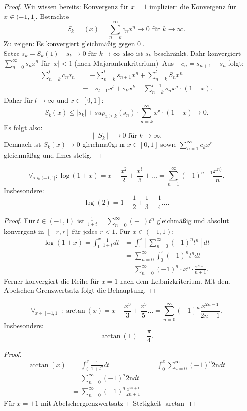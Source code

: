 \begin{proof}
    Wir wissen bereits: Konvergenz für $x=1$ impliziert die Konvergenz für $x \in (-1,1]$. Betrachte
    \[
        S_k=(x)= \sum_{n=k}^{\infty} c_nx^{n} \to 0 \text{ für  } k \to \infty
    .\]
    Zu zeigen: Es konvergiert gleichmäßig gegen $0$ . \\
    Setze $s_k= S_k(1) \quad s_k \to 0$ für $k \to \infty$ also ist $s_k$ beschränkt. Dahr konvergiert $\sum_{n=0}^{\infty} s_nx^{n}$ für $|x| <1$ (nach Majorantenkriterium). Aus $-c_n = s_{n+1}-s_n$ folgt:
\begin{align*}
    \sum_{n=k}^{l} c_nx_n &= -\sum_{n=k}^{l} s_{n+1}x^{n}+ \sum_{n=k}^{l} S_n x^{n} \\
                          &= -s_{l+1} x^{l}+ s_k x^k - \sum_{n=k}^{l-1} s_n x^{n}\cdot (1-x)
.\end{align*}
Daher für $l \to \infty$ und $x \in [0,1]$: 
\[
S_k(x) \le  |s_k| + sup_{n\ge k}(s_n) \cdot \sum_{n=k}^{\infty} x^{n}\cdot (1-x) \to 0
.\] 
Es folgt also:
\[
    \|S_k\| \to 0 \text{ für  } k \to \infty
.\]
Demnach ist $S_k(x) \to 0$ gleichmä0gi in $x \in [0,1]$ sowie $\sum_{n=1}^{\infty} c_kx^{n}$ gleichmäßug und limes stetig. 
\end{proof}
\begin{theorem}
\[
    \forall_{x \in (-1,1]}: \log(1+x) = x-\frac{x^2}{2}+ \frac{x^3}{3}+ \ldots = \sum_{n=1}^{\infty} (-1)^{n+1}\frac{x^{n)}}{n}
.\]
Insbesondere: \[
\log(2)= 1-\frac{1}{2}+ \frac{1}{3} - \frac{1}{4} \ldots
.\] 
\end{theorem}
\begin{proof}
    Für $t \in (-1,1)$ ist $\frac{1}{1+t}= \sum_{n=0}^{\infty} (-1)t^n$ gleichmäßig und absolut konvergent in $[-r,r]$ für jedes $r<1$.
    Für $x \in (-1,1):$
    \begin{align*}
        \log(1+x) = \int_0^x \frac{1}{1+t}dt &= \int_0^x \left[ \sum_{n=0}^{\infty} (-1)^{n}t^n\right ] dt \\
                                             &= \sum_{n=0}^{\infty} \int_0^x (-1)^{n}t^n dt \\
                                             &= \sum_{n=0}^{\infty} (-1)^{n}\cdot x^{n}\cdot \frac{x^{n+1}}{n+1}
    .\end{align*}
    Ferner konvergiert die Reihe für $x=1$ nach dem Leibnizkriterium. Mit dem Abelschen Grenzwertsatz folgt die Behauptung.
\end{proof}
\begin{theorem}
\[
\forall_{x \in [-1,1]}: \arctan(x) = x- \frac{x^3}{3}+ \frac{x^5}{5} \ldots = \sum_{n=0}^{\infty} (-1)^{n}\frac{x^{2n+1}}{2n+1}
.\] Insbesonders: \[
\arctan(1)= \frac{\pi}{4}
.\] 
\end{theorem}
\begin{proof}
\begin{align*}
    \arctan(x) &= \int_0^x \frac{1}{1+t^2}dt &= \int_0^x \sum_{n=0}^{\infty} (-1)^{n}\text{2n}dt \\
               &= \sum_{n=0}^{\infty} (-1)^{n}\text{2n}dt \\
               &= \sum_{n=0}^{\infty} (-1)^{n}\frac{x^{2n+1}}{2n+1}
.\end{align*}
Für $x= \pm 1$ mit Abelschergrenzwertsatz + Stetigkeit $\arctan$ 
\end{proof}
